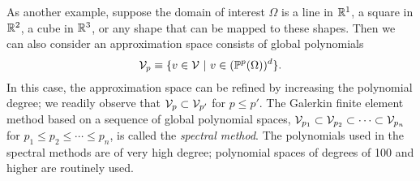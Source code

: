 As another example, suppose the domain of interest $\Omega$ is a line in $\mathbb{R}^1$, a square in $\mathbb{R}^2$, a cube in $\mathbb{R}^3$, or any shape that can be mapped to these shapes. Then we can also consider an approximation space consists of global polynomials
\begin{equation*}
  \mathcal{V}_p \equiv \{ v \in \mathcal{V} \ | \ v \in (\mathbb{P}^p(\Omega))^d \}.
\end{equation*}
In this case, the approximation space can be refined by increasing the polynomial degree; we readily observe that $\mathcal{V}_{p} \subset \mathcal{V}_{p'}$ for $p \leq p'$. The Galerkin finite element method based on a sequence of global polynomial spaces, $\mathcal{V}_{p_1} \subset \mathcal{V}_{p_2} \subset \cdots \subset \mathcal{V}_{p_n}$ for $p_1 \leq p_2 \leq \cdots \leq p_n$, is called the \emph{spectral method}.  The polynomials used in the spectral methods are of very high degree; polynomial spaces of degrees of 100 and higher are routinely used.

